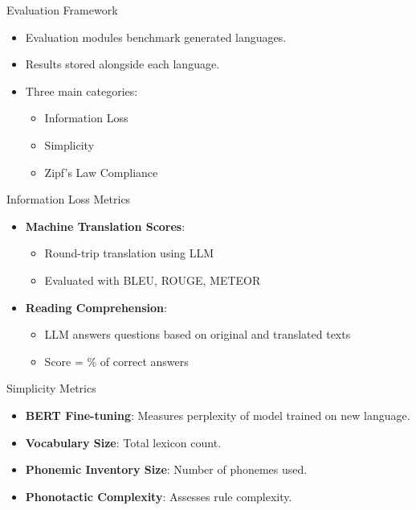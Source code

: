 \documentclass{beamer}
\begin{document}
\begin{frame}{Evaluation Framework}
	\begin{itemize}
		\item Evaluation modules benchmark generated languages.
		\item Results stored alongside each language.
		\item Three main categories:
		\begin{itemize}
			\item Information Loss
			\item Simplicity
			\item Zipf's Law Compliance
		\end{itemize}
	\end{itemize}
\end{frame}

\begin{frame}{Information Loss Metrics}
	\begin{itemize}
		\item \textbf{Machine Translation Scores}:
		\begin{itemize}
			\item Round-trip translation using LLM
			\item Evaluated with BLEU, ROUGE, METEOR
		\end{itemize}
		\item \textbf{Reading Comprehension}:
		\begin{itemize}
			\item LLM answers questions based on original and translated texts
			\item Score = \% of correct answers
		\end{itemize}
	\end{itemize}
\end{frame}

\begin{frame}{Simplicity Metrics}
	\begin{itemize}
		\item \textbf{BERT Fine-tuning}: Measures perplexity of model trained on new language.
		\item \textbf{Vocabulary Size}: Total lexicon count.
		\item \textbf{Phonemic Inventory Size}: Number of phonemes used.
		\item \textbf{Phonotactic Complexity}: Assesses rule complexity.
	\end{itemize}
\end{frame}
\end{document}
